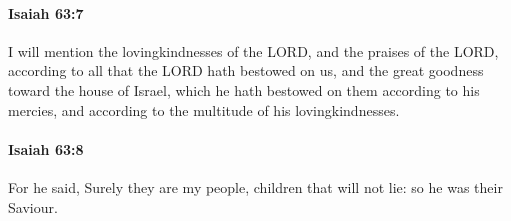 		\paragraph{Isaiah 63:7} %
			\label{ISAIAH-63-7}

			I will mention the lovingkindnesses of the LORD, and the praises of the LORD, according to all that the LORD hath bestowed on us, and the great goodness toward the house of Israel, which he hath bestowed on them according to his mercies, and according to the multitude of his lovingkindnesses.


		\paragraph{Isaiah 63:8} %
			\label{ISAIAH-63-8}

			For he said, Surely they are my people, children that will not lie: so he was their Saviour.

